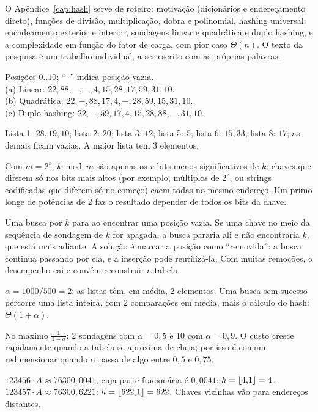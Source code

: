  O Apêndice~\ref{cap:hash} serve de roteiro: motivação (dicionários e endereçamento direto), funções de divisão, multiplicação, dobra e polinomial, hashing universal, encadeamento exterior e interior, sondagens linear e quadrática e duplo hashing, e a complexidade em função do fator de carga, com pior caso $\Theta(n)$. O texto da pesquisa é um trabalho individual, a ser escrito com as próprias palavras.

 Posições $0..10$; ``--'' indica posição vazia.\\
\hspace*{1em}(a) Linear: $22,88,-,-,4,15,28,17,59,31,10$.\\
\hspace*{1em}(b) Quadrática: $22,-,88,17,4,-,28,59,15,31,10$.\\
\hspace*{1em}(c) Duplo hashing: $22,-,59,17,4,15,28,88,-,31,10$.

 Lista 1: $28,19,10$; lista 2: $20$; lista 3: $12$; lista 5: $5$; lista 6: $15,33$; lista 8: $17$; as demais ficam vazias. A maior lista tem 3 elementos.

 Com $m=2^r$, $k\bmod m$ são apenas os $r$ bits menos significativos de $k$: chaves que diferem só nos bits mais altos (por exemplo, múltiplos de $2^r$, ou strings codificadas que diferem só no começo) caem todas no mesmo endereço. Um primo longe de potências de 2 faz o resultado depender de todos os bits da chave.

 Uma busca por $k$ para ao encontrar uma posição vazia. Se uma chave no meio da sequência de sondagem de $k$ for apagada, a busca pararia ali e não encontraria $k$, que está mais adiante. A solução é marcar a posição como ``removida'': a busca continua passando por ela, e a inserção pode reutilizá-la. Com muitas remoções, o desempenho cai e convém reconstruir a tabela.

 $\alpha=1000/500=2$: as listas têm, em média, 2 elementos. Uma busca sem sucesso percorre uma lista inteira, com 2 comparações em média, mais o cálculo do hash: $\Theta(1+\alpha)$.

 No máximo $\frac1{1-\alpha}$: 2 sondagens com $\alpha=0{,}5$ e 10 com $\alpha=0{,}9$. O custo cresce rapidamente quando a tabela se aproxima de cheia; por isso é comum redimensionar quando $\alpha$ passa de algo entre $0{,}5$ e $0{,}75$.

 $123456\cdot A\approx76300{,}0041$, cuja parte fracionária é $0{,}0041$: $h=\lfloor4{,}1\rfloor=4$. $123457\cdot A\approx76300{,}6221$: $h=\lfloor622{,}1\rfloor=622$. Chaves vizinhas vão para endereços distantes.

